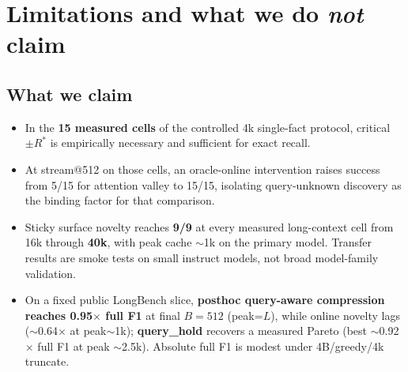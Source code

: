 \documentclass[11pt,a4paper]{article}
\begin{document}
\section{Limitations and what we do \emph{not} claim}
\label{sec:limits}

\subsection{What we claim}

\begin{itemize}[leftmargin=*,itemsep=2pt]
  \item In the \textbf{15 measured cells} of the controlled 4k single-fact protocol, critical$\pm R^*$ is empirically necessary and sufficient for exact recall.
  \item At stream@512 on those cells, an oracle-online intervention raises success from 5/15 for attention valley to 15/15, isolating query-unknown discovery as the binding factor for that comparison.
  \item Sticky surface novelty reaches \textbf{9/9} at every measured long-context cell from 16k through \textbf{40k}, with peak cache $\sim$1k on the primary model. Transfer results are smoke tests on small instruct models, not broad model-family validation.
  \item On a fixed public LongBench slice, \textbf{posthoc query-aware compression reaches 0.95$\times$ full F1} at final $B{=}512$ (peak=$L$), while online novelty lags ($\sim$0.64$\times$ at peak$\sim$1k); \textbf{query\_hold} recovers a measured Pareto (best $\sim$0.92$\times$ full F1 at peak $\sim$2.5k). Absolute full F1 is modest under 4B/greedy/4k truncate.
\end{itemize}
\end{document}
